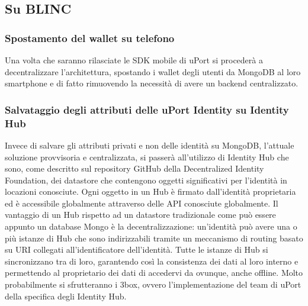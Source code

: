 \subsection{Su BLINC}

\subsubsection{Spostamento del wallet su telefono}

Una volta che saranno rilasciate le SDK mobile di uPort si procederà a decentralizzare
l’architettura, spostando i wallet degli utenti da MongoDB al loro smartphone e di fatto
rimuovendo la necessità di avere un backend centralizzato.

\subsubsection{Salvataggio degli attributi delle uPort Identity su Identity Hub}

Invece di salvare gli attributi privati e non delle identità su MongoDB, l’attuale soluzione provvisoria
e centralizzata, si passerà all’utilizzo di Identity Hub che sono, come descritto
sul repository GitHub della Decentralized Identity Foundation, dei datastore che contengono
oggetti significativi per l’identità in locazioni conosciute. Ogni oggetto in un Hub è firmato
dall’identità proprietaria ed è accessibile globalmente attraverso delle API conosciute globalmente.
Il vantaggio di un Hub rispetto ad un datastore tradizionale come può essere appunto un database
Mongo è la decentralizzazione: un’identità può avere una o più istanze di Hub che sono indirizzabili
tramite un meccanismo di routing basato su URI collegati all’identificatore dell’identità.
Tutte le istanze di Hub si sincronizzano tra di loro, garantendo così la consistenza dei dati
al loro interno e permettendo al proprietario dei dati di accedervi da ovunque, anche offline.
Molto probabilmente si sfrutteranno i 3box,
ovvero l’implementazione del team di uPort della specifica degli Identity Hub.